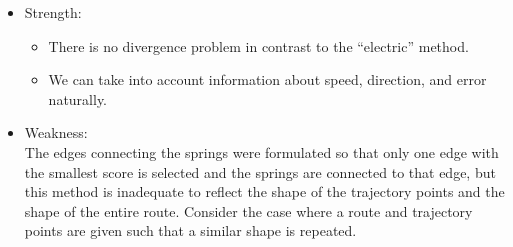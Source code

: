 \documentclass{article}
\numberwithin{equation}{section}
\theoremstyle{definition}
\begin{document}
\begin{itemize}
    \item
    Strength: 
    \begin{itemize}
        \item
        There is no divergence problem in contrast to the ``electric'' method.
        \item
        We can take into account information about speed, direction, and error naturally.
    \end{itemize}
    \item
    Weakness: \\
    The edges connecting the springs were formulated so that only one edge with the smallest score is selected and the springs are connected to that edge, but this method is inadequate to reflect the shape of the trajectory points and the shape of the entire route.
    Consider the case where a route and trajectory points are given such that a similar shape is repeated. 
    

\end{itemize}
\end{document}
